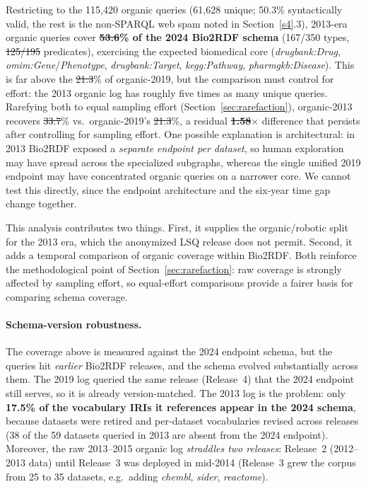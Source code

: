 \documentclass[sw]{iosart2x}
\providecommand{\DIFadd}[1]{{\protect\color{blue}\uwave{#1}}} %
\providecommand{\DIFdel}[1]{{\protect\color{red}\sout{#1}}} %
\providecommand{\DIFaddbegin}{} %
\providecommand{\DIFaddend}{} %
\providecommand{\DIFdelbegin}{} %
\providecommand{\DIFdelend}{} %
\providecommand{\DIFscaledelfig}{0.5}
\newlength{\DIFdelgraphicswidth} %
\newlength{\DIFdelgraphicsheight} %
\providecommand{\DIFaddincludegraphics}[2][]{{\color{blue}\fbox{\DIFOincludegraphics[#1]{#2}}}} %
\providecommand{\DIFdelincludegraphics}[2][]{%
\sbox{\DIFdelgraphicsbox}{\DIFOincludegraphics[#1]{#2}}%
\settoboxwidth{\DIFdelgraphicswidth}{\DIFdelgraphicsbox} %
\settoboxtotalheight{\DIFdelgraphicsheight}{\DIFdelgraphicsbox} %
\scalebox{\DIFscaledelfig}{%
\parbox[b]{\DIFdelgraphicswidth}{\usebox{\DIFdelgraphicsbox}\\[-\baselineskip] \rule{\DIFdelgraphicswidth}{0em}}\llap{\resizebox{\DIFdelgraphicswidth}{\DIFdelgraphicsheight}{%
\setlength{\unitlength}{\DIFdelgraphicswidth}%
\begin{picture}(1,1)%
\thicklines\linethickness{2pt} %
{\color[rgb]{1,0,0}\put(0,0){\framebox(1,1){}}}%
{\color[rgb]{1,0,0}\put(0,0){\line( 1,1){1}}}%
{\color[rgb]{1,0,0}\put(0,1){\line(1,-1){1}}}%
\end{picture}%
}\hspace*{3pt}}} %
} %
\DeclareRobustCommand{\DIFaddbegin}{\DIFOaddbegin \let\includegraphics\DIFaddincludegraphics} %
\DeclareRobustCommand{\DIFaddend}{\DIFOaddend \let\includegraphics\DIFOincludegraphics} %
\DeclareRobustCommand{\DIFdelbegin}{\DIFOdelbegin \let\includegraphics\DIFdelincludegraphics} %
\DeclareRobustCommand{\DIFdelend}{\DIFOaddend \let\includegraphics\DIFOincludegraphics} %
\begin{document}
Restricting to the 115{,}420 organic queries (61{,}628 unique; 50.3\% syntactically valid, the rest is the non-SPARQL web spam noted in Section~\ref{s4}.3), 2013-era organic queries cover \textbf{\DIFdelbegin \DIFdel{53.6}\DIFdelend \DIFaddbegin \DIFadd{53.4}\DIFaddend \% of the 2024 Bio2RDF schema} (167/350 types, \DIFdelbegin \DIFdel{125/195 }\DIFdelend \DIFaddbegin \DIFadd{122/191 }\DIFaddend predicates), exercising the expected biomedical core (\emph{drugbank:Drug}, \emph{omim:Gene}/\emph{Phenotype}, \emph{drugbank:Target}, \emph{kegg:Pathway}, \emph{pharmgkb:Disease}). This is far above the \DIFdelbegin \DIFdel{21.3}\DIFdelend \DIFaddbegin \DIFadd{20.9}\DIFaddend \% of organic-2019, but the comparison must control for effort: the 2013 organic log has roughly five times as many unique queries. Rarefying both to equal sampling effort (Section~\ref{sec:rarefaction}), organic-2013 recovers \DIFdelbegin \DIFdel{33.7}\DIFdelend \DIFaddbegin \DIFadd{26.7}\DIFaddend \% vs.\ organic-2019's \DIFdelbegin \DIFdel{21.3}\DIFdelend \DIFaddbegin \DIFadd{20.9}\DIFaddend \%, a residual \textbf{\DIFdelbegin \DIFdel{1.58}\DIFdelend \DIFaddbegin \DIFadd{1.28}\DIFaddend $\times$} difference that persists after controlling for sampling effort. One possible explanation is architectural: in 2013 Bio2RDF exposed a \emph{separate endpoint per dataset}, so human exploration may have spread across the specialized subgraphs, whereas the single unified 2019 endpoint may have concentrated organic queries on a narrower core. We cannot test this directly, since the endpoint architecture and the six-year time gap change together.

This analysis contributes two things. First, it supplies the organic/robotic split for the 2013 era, which the anonymized LSQ release does not permit. Second, it adds a temporal comparison of organic coverage within Bio2RDF. Both reinforce the methodological point of Section~\ref{sec:rarefaction}: raw coverage is strongly affected by sampling effort, so equal-effort comparisons provide a fairer basis for comparing schema coverage.

\paragraph{\textbf{Schema-version robustness.}} The coverage above is measured against the 2024 endpoint schema, but the queries hit \emph{earlier} Bio2RDF releases, and the schema evolved substantially across them. The 2019 log queried the same release (Release~4) that the 2024 endpoint still serves, so it is already version-matched. The 2013 log is the problem: only \textbf{17.5\% of the vocabulary IRIs it references appear in the 2024 schema}, because datasets were retired and per-dataset vocabularies revised across releases (38 of the 59 datasets queried in 2013 are absent from the 2024 endpoint). Moreover, the raw 2013--2015 organic log \emph{straddles two releases}: Release~2 (2012--2013 data) until Release~3 was deployed in mid-2014 (Release~3 grew the corpus from 25 to 35 datasets, e.g.\ adding \emph{chembl}, \emph{sider}, \emph{reactome}).
\end{document}
